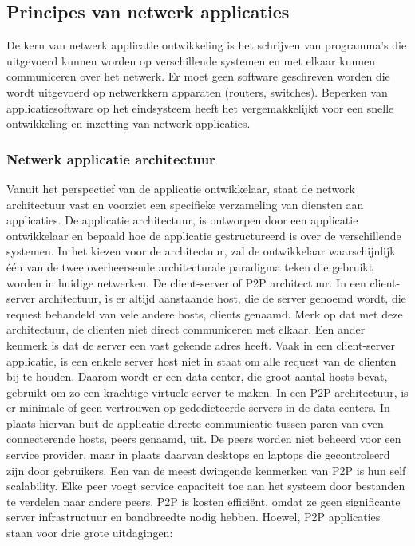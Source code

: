 \subsection{Principes van netwerk applicaties}

De kern van netwerk applicatie ontwikkeling is het schrijven van programma’s die uitgevoerd kunnen worden op verschillende systemen en met elkaar kunnen communiceren over het netwerk.
Er moet geen software geschreven worden die wordt uitgevoerd op netwerkkern apparaten (routers, switches). Beperken van applicatiesoftware op het eindsysteem heeft het vergemakkelijkt voor een snelle ontwikkeling en inzetting van netwerk applicaties.

\subsubsection{Netwerk applicatie architectuur}

Vanuit het perspectief van de applicatie ontwikkelaar, staat de network architectuur vast en voorziet een specifieke verzameling van diensten aan applicaties. De applicatie architectuur, is ontworpen door een applicatie ontwikkelaar en bepaald hoe de applicatie gestructureerd is over de verschillende systemen. In het kiezen voor de architectuur, zal de ontwikkelaar waarschijnlijk één van de twee overheersende architecturale paradigma teken die gebruikt worden in huidige netwerken. De client-server of P2P architectuur.
In een client-server architectuur, is er altijd aanstaande host, die de server genoemd wordt, die request behandeld van vele andere hosts, clients genaamd. Merk op dat met deze architectuur, de clienten niet direct communiceren met elkaar. Een ander kenmerk is dat de server een vast gekende adres heeft. Vaak in een client-server applicatie, is een enkele server host niet in staat om alle request van de clienten bij te houden. Daarom wordt er een data center, die groot aantal hosts bevat, gebruikt om zo een krachtige virtuele server te maken.
In een P2P architectuur, is er minimale of geen vertrouwen op gededicteerde servers in de data centers. In plaats hiervan buit de applicatie directe communicatie tussen paren van even connecterende hosts, peers genaamd, uit. De peers worden niet beheerd voor een service provider, maar in plaats daarvan desktops en laptops die gecontroleerd zijn door gebruikers.
Een van de meest dwingende kenmerken van P2P is hun self scalability. Elke peer voegt service capaciteit toe aan het systeem door bestanden te verdelen naar andere peers. P2P is kosten efficiënt, omdat ze geen significante server infrastructuur en bandbreedte nodig hebben.
\newpage \noindent Hoewel, P2P applicaties staan voor drie grote uitdagingen:

